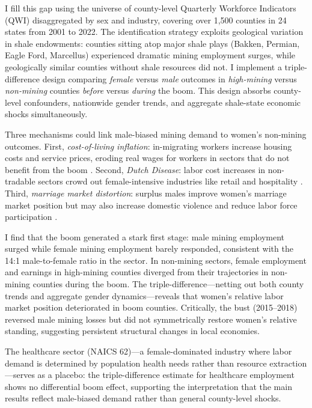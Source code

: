 \documentclass[12pt]{article}
\begin{document}
I fill this gap using the universe of county-level Quarterly Workforce Indicators (QWI) disaggregated by sex and industry, covering over 1,500 counties in 24 states from 2001 to 2022. The identification strategy exploits geological variation in shale endowments: counties sitting atop major shale plays (Bakken, Permian, Eagle Ford, Marcellus) experienced dramatic mining employment surges, while geologically similar counties without shale resources did not. I implement a triple-difference design comparing \textit{female} versus \textit{male} outcomes in \textit{high-mining} versus \textit{non-mining} counties \textit{before} versus \textit{during} the boom. This design absorbs county-level confounders, nationwide gender trends, and aggregate shale-state economic shocks simultaneously.

Three mechanisms could link male-biased mining demand to women's non-mining outcomes. First, \textit{cost-of-living inflation}: in-migrating workers increase housing costs and service prices, eroding real wages for workers in sectors that do not benefit from the boom \citep{Jacobsen2007, Weber2012}. Second, \textit{Dutch Disease}: labor cost increases in non-tradable sectors crowd out female-intensive industries like retail and hospitality \citep{Corden1984, Allcott2018}. Third, \textit{marriage market distortion}: surplus males improve women's marriage market position but may also increase domestic violence and reduce labor force participation \citep{Becker1973, Aizer2010, Charles2018}.

I find that the boom generated a stark first stage: male mining employment surged while female mining employment barely responded, consistent with the 14:1 male-to-female ratio in the sector. In non-mining sectors, female employment and earnings in high-mining counties diverged from their trajectories in non-mining counties during the boom. The triple-difference---netting out both county trends and aggregate gender dynamics---reveals that women's relative labor market position deteriorated in boom counties. Critically, the bust (2015--2018) reversed male mining losses but did not symmetrically restore women's relative standing, suggesting persistent structural changes in local economies.

The healthcare sector (NAICS 62)---a female-dominated industry where labor demand is determined by population health needs rather than resource extraction---serves as a placebo: the triple-difference estimate for healthcare employment shows no differential boom effect, supporting the interpretation that the main results reflect male-biased demand rather than general county-level shocks.
\end{document}
